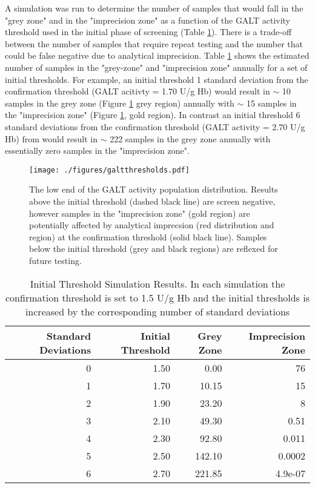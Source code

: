 \documentclass[review]{elsarticle}
\begin{document}
A simulation was run to determine the number of samples that would
fall in the "grey zone" and in the "imprecision zone" as a function of
the GALT activity threshold used in the initial phase of screening
(Table \ref{tab:imprecision}). There is a trade-off between the number
of samples that require repeat testing and the number that could be
false negative due to analytical imprecision. Table
\ref{tab:imprecision} shows the estimated number of samples in the
"grey-zone" and "imprecision zone" annually for a set of initial
thresholds. For example, an initial threshold 1 standard deviation
from the confirmation threshold (GALT acitivty = 1.70 U/g Hb) would
result in \(\sim\) 10 samples in the grey zone (Figure \ref{fig:org3dd609b}
grey region) annually with \(\sim\) 15 samples in the "imprecision zone"
(Figure \ref{fig:org3dd609b}, gold region). In contrast an initial
threshold 6 standard deviations from the confirmation threshold (GALT
activity = 2.70 U/g Hb) from would result in \(\sim\) 222 samples in the
grey zone annually with essentially zero samples in the "imprecision
zone".

\begin{figure}[htbp]
\centering
\texttt{[image: ./figures/galtthresholds.pdf]}
\caption{\label{fig:org3dd609b}The low end of the GALT activity population distribution. Results above the initial threshold (dashed black line) are screen negative, however samples in the "imprecision zone" (gold region) are potentially affected by analytical imprecsion (red distribution and region) at the confirmation threshold (solid black line). Samples below the initial threshold (grey and black regions) are reflexed for future testing.}
\end{figure}


\begin{table}[ht]
\centering
\begin{tabular}{rrrr}
  \hline
Standard Deviations & Initial Threshold & Grey Zone & Imprecision Zone \\ 
  \hline
  0 & 1.50 & 0.00 &  76 \\ 
    1 & 1.70 & 10.15 &  15 \\ 
    2 & 1.90 & 23.20 &   8 \\ 
    3 & 2.10 & 49.30 & 0.51 \\ 
    4 & 2.30 & 92.80 & 0.011 \\ 
    5 & 2.50 & 142.10 & 0.0002 \\ 
    6 & 2.70 & 221.85 & 4.9e-07 \\ 
   \hline
\end{tabular}
\caption{Initial Threshold Simulation Results. In each simulation the confirmation threshold is set to 1.5 U/g Hb and the initial thresholds is increased by the corresponding number of standard deviations} 
\label{tab:imprecision}
\end{table}
\end{document}
